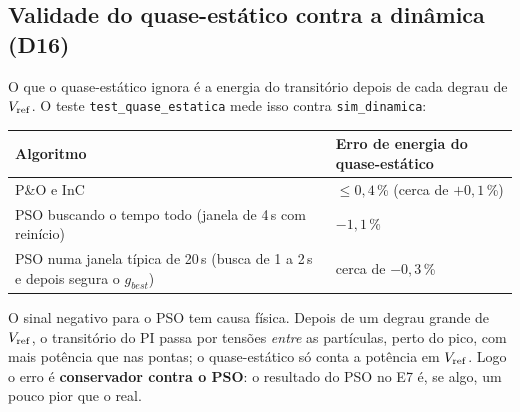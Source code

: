 \subsection{Validade do quase-est\'atico contra a din\^amica (D16)}

O que o quase-est\'atico ignora \'e a energia do transit\'orio depois de cada degrau de $V_{\mathrm{ref}}$. O teste \texttt{test\_quase\_estatica} mede isso contra \texttt{sim\_dinamica}:

\begin{resultado}
\small\centering
\begin{tabular}{@{}ll@{}}
\toprule
Algoritmo & Erro de energia do quase-est\'atico \\ \midrule
P\&O e InC & $\le0{,}4$\,\% (cerca de $+0{,}1$\,\%) \\
PSO buscando o tempo todo (janela de 4\,s com rein\'icio) & $-1{,}1$\,\% \\
PSO numa janela t\'ipica de 20\,s (busca de 1 a 2\,s e depois segura o $g_{best}$) & cerca de $-0{,}3$\,\% \\
\bottomrule
\end{tabular}
\end{resultado}

O sinal negativo para o PSO tem causa f\'isica. Depois de um degrau grande de $V_{\mathrm{ref}}$, o transit\'orio do PI passa por tens\~oes \emph{entre} as part\'iculas, perto do pico, com mais pot\^encia
que nas pontas; o quase-est\'atico s\'o conta a pot\^encia em $V_{\mathrm{ref}}$. Logo o erro \'e \textbf{conservador contra o PSO}: o resultado do PSO no E7 \'e, se algo, um pouco pior que o real.
